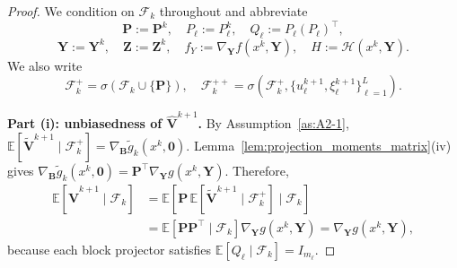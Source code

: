 \documentclass{pkumelon}
\theoremstyle{plain}
\newcommand{\E}{\mathbb{E}}
\begin{document}
\begin{proof}
We condition on $\mathcal F_k$ throughout and abbreviate
\begin{equation*}
\boldsymbol P:=\boldsymbol P^k,\quad P_\ell:=P_\ell^k,\quad Q_\ell:=P_\ell(P_\ell)^\top,
\end{equation*}
\begin{equation*}
\boldsymbol Y:=\boldsymbol Y^k,\quad \boldsymbol Z:=\boldsymbol Z^k,\quad f_Y:=\nabla_{\boldsymbol Y}f(x^k,\boldsymbol Y),\quad H:=\mathcal H(x^k,\boldsymbol Y).
\end{equation*}
We also write
\begin{equation*}
\mathcal F_k^+=\sigma(\mathcal F_k\cup\{\boldsymbol P\}), \quad \mathcal F_k^{++} = \sigma\!\left(\mathcal F_k^+,\{u_\ell^{k+1},\xi_\ell^{k+1}\}_{\ell=1}^L\right).
\end{equation*}

\textbf{Part (i): unbiasedness of $\widehat{\boldsymbol V}^{k+1}$. }
By Assumption~\ref{as:A2-1}, $\E[\tilde{\boldsymbol V}^{k+1}\mid \mathcal F_k^+] = \nabla_{\boldsymbol B}\tilde g_k(x^k,\mathbf 0)$. Lemma~\ref{lem:projection_moments_matrix}(iv) gives $\nabla_{\boldsymbol B}\tilde g_k(x^k,\mathbf 0) = \boldsymbol P^\top \nabla_{\boldsymbol Y}g(x^k,\boldsymbol Y)$. Therefore,
\begin{equation*}
\begin{aligned}
\E[\widehat{\boldsymbol V}^{k+1}\mid \mathcal F_k]
&=
\E\!\left[\boldsymbol P\,\E[\tilde{\boldsymbol V}^{k+1}\mid \mathcal F_k^+]\mid \mathcal F_k\right] \\
&=
\E[\boldsymbol P\boldsymbol P^\top\mid \mathcal F_k]\nabla_{\boldsymbol Y}g(x^k,\boldsymbol Y)
=
\nabla_{\boldsymbol Y}g(x^k,\boldsymbol Y),
\end{aligned}
\end{equation*}
because each block projector satisfies $\E[Q_\ell\mid\mathcal F_k]=I_{m_\ell}$.


\end{proof}
\end{document}

